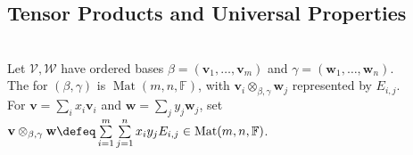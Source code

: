 \subsection{Tensor Products and Universal Properties}

\begin{definition} \label{def:finite-coordinate-tensor-product-model} \\
Let $\mathcal{V},\mathcal{W}$ have ordered bases $\beta=(\mathbf{v}_1,\ldots,\mathbf{v}_m)$ and $\gamma=(\mathbf{w}_1,\ldots,\mathbf{w}_n)$.\\
The  for $(\beta,\gamma)$ is $\operatorname{Mat}(m,n,\mathbb{F})$, with $\mathbf{v}_i\otimes_{\beta,\gamma}\mathbf{w}_j$ represented by $E_{i,j}$.\\
For $\mathbf{v}=\sum_i x_i\mathbf{v}_i$ and $\mathbf{w}=\sum_j y_j\mathbf{w}_j$, set $\mathbf{v}\otimes_{\beta,\gamma}\mathbf{w} \defeq \sum\limits_{i=1}^m\sum\limits_{j=1}^n x_i y_j E_{i,j} \in\operatorname{Mat}(m,n,\mathbb{F})$.
\end{definition}

